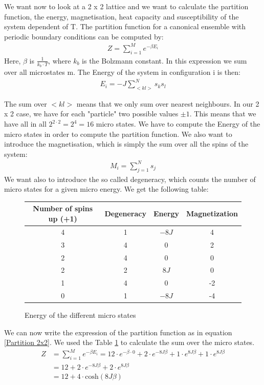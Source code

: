 \documentclass[10pt,a4paper]{article}
\begin{document}
We want now to look at a 2 x 2 lattice and we want to calculate the partition function, the energy, magnetisation, heat capacity and susceptibility of the system  dependent of T. 
The partition function for a canonical ensemble with periodic boundary conditions can be computed  by:
\begin{align}
Z= \sum_{i=1}^{M} e^{- \beta E_i}
\end{align} 
Here, $\beta$ is $\frac{1}{k_b \cdot T}$, where $k_b$ is the Bolzmann constant. 
In this expression we sum over all microstates m. The Energy of the system in configuration i is then:
\begin{align}
E_i = - J \sum_{<kl>}^N s_k s_l 
\end{align} 

The sum over $<kl>$ means that we only sum over nearest neighbours. In our 2 x 2 case, we have for each "particle" two possible values $\pm 1$. This means that we have all in all $2^{2 \cdot 2} = 2^4=16$ micro states. We have to compute the Energy of the micro states in order to compute the partition function. 
We also want to introduce the magnetisation, which is simply the sum over all the spins of the system:
\begin{align}
M_i=\sum_{j=1}^N s_j
\end{align}
We want also to introduce the so called degeneracy, which counts the number of micro states for a given micro energy. We get the following table:
\begin{figure}[h]
\centering
\caption{Energy of the different micro states}
\label{table of microstates}
\begin{tabular}{c|c|c|c}
Number of spins up (+1) & Degeneracy &  Energy & Magnetization\\
\hline \hline
4 & 1 & $-8J$ & 4 \\
3 & 4 & 0 & 2 \\
2 & 4 & 0 & 0 \\
2 & 2 & $8J$ & 0 \\
1 & 4 & 0 & -2 \\
0 & 1 & $-8J$ & -4 
\end{tabular}
\end{figure}
We can now write the expression of the partition function as in equation \ref{Partition 2x2}. We used the Table \ref{table of microstates} to calculate the sum over the micro states. 
\begin{align}
Z&= \sum_{i=1}^{M} e^{- \beta E_i}= 12 \cdot e^{-\beta \cdot 0 } + 2 \cdot e^{-8J \beta } + 1 \cdot e^{8J \beta } + 1 \cdot e^{8J \beta } \\
&= 12+ 2 \cdot e^{-8J \beta } + 2 \cdot e^{8J \beta } \\
&= 12+ 4 \cdot \mathrm{cosh} \left( 8J \beta \right) \label{Partition 2x2}
\end{align} 
\end{document}
